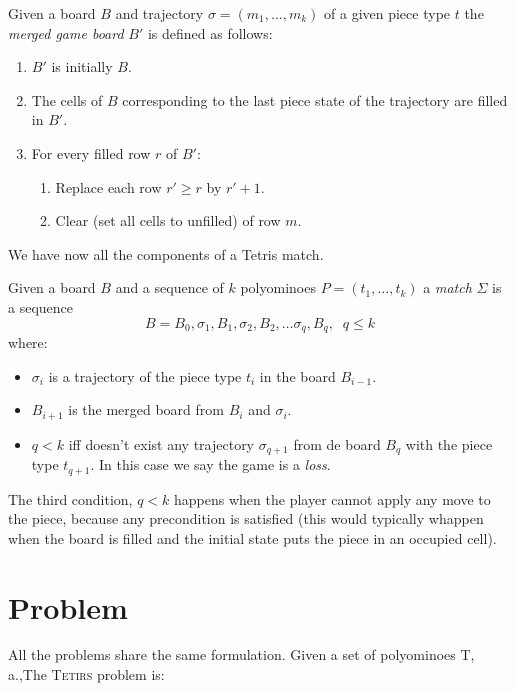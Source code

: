 \begin{definition} 
  Given a board $B$ and trajectory $\sigma = (m_1, ..., m_k)$ of a given piece type $t$ the \emph{merged game board} $B'$ is defined as follows:
  \begin{enumerate}
    \item $B'$ is initially $B$.
    \item The cells of $B$ corresponding to the last piece state of the trajectory are filled in $B'$.
    \item For every filled row $r$ of $B'$:
      \begin{enumerate}
        \item Replace each row $r' \geq r$ by $r'+1$.
        \item Clear (set all cells to unfilled) of row $m$.
      \end{enumerate}
  \end{enumerate}
\end{definition}

We have now all the components of a Tetris match.

\begin{definition} 
  Given a board $B$ and a sequence of $k$ polyominoes $P = (t_1,\dots,t_k)$ a \emph{match} $\Sigma$ is a sequence
  $$ B = B_0, \sigma_1, B_1, \sigma_2, B_2, \dots  \sigma_q, B_q, \; \; q \leq k$$ 
  where:
  \begin{itemize}
    \item $\sigma_i$ is a trajectory of the piece type $t_i$ in the board $B_{i-1}$.
    \item $B_{i+1}$ is the merged board from $B_i$ and $\sigma_i$.
    \item $q < k$ iff doesn't exist any trajectory $\sigma_{q+1}$ from de board $B_q$ with the piece type $t_{q+1}$. In this case we say the game is a \emph{loss}.
  \end{itemize}
\end{definition}

The third condition, $q < k$ happens when the player cannot apply any move to the piece, because any precondition is satisfied (this would typically whappen when the board is filled and the initial state puts the piece in an occupied cell).

\section{Problem}

All the problems share the same formulation. Given a set of polyominoes T, a.,The \textsc{Tetirs} problem is:

